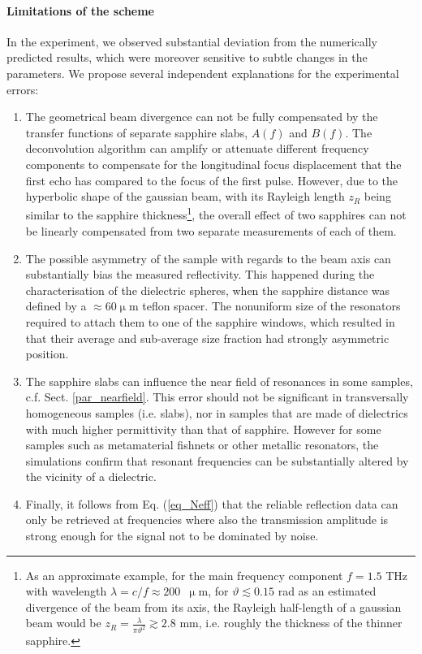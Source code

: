 \paragraph{Limitations of the scheme} %
In the experiment, we observed substantial deviation  %
from the numerically predicted results, which were moreover sensitive to subtle changes in the parameters. We propose  several independent explanations for the experimental errors:
\begin{enumerate}
\item{The geometrical beam divergence can not be fully compensated by the transfer functions of separate sapphire slabs, $A(f)$ and $B(f)$. The deconvolution algorithm can amplify or attenuate different frequency components to compensate for the  longitudinal focus displacement that the first echo has compared to the focus of the first pulse. However, due to the hyperbolic shape of the gaussian beam, with its Rayleigh length $z_{R}$ being similar to the sapphire thickness\footnote{As an approximate example, for the main frequency component $f = 1.5$ THz with wavelength $\lambda = c / f \approx 200$~$\upmu$m, for $\vartheta \lesssim 0.15$ rad as an estimated divergence of the beam from its axis, the Rayleigh half-length of a gaussian beam would be $z_{R} = \frac{\lambda}{\pi \vartheta^{2}} \gtrsim 2.8$ mm, i.e. roughly the thickness of the thinner sapphire.}, the overall effect of two sapphires can not be linearly compensated from two separate measurements of each of them.} 
 \item{The possible asymmetry of the sample with regards to the beam axis can substantially bias the measured reflectivity. This happened during the characterisation of the dielectric spheres, when the sapphire distance was defined by a $\approx$60$\upmu$m teflon spacer. The nonuniform size of the resonators required to attach them to one of the sapphire windows, which resulted in that their average and sub-average size fraction had strongly asymmetric position. } 
 \item{The sapphire slabs can influence the near field of resonances in some samples, c.f. Sect. \ref{par_nearfield}. This error should not be significant in transversally homogeneous samples (i.e. slabs), nor in samples that are made of dielectrics with much higher permittivity than that of sapphire. However for some samples such as metamaterial fishnets or other metallic resonators, the simulations confirm that resonant frequencies can be substantially altered by the vicinity of a dielectric. }
 \item{Finally, it follows from Eq. (\ref{eq_Neff})
 that the reliable reflection data can only be retrieved at frequencies where also the transmission amplitude is strong enough for the signal not to be dominated by noise. }
 \end{enumerate}
\label{srtm2}


